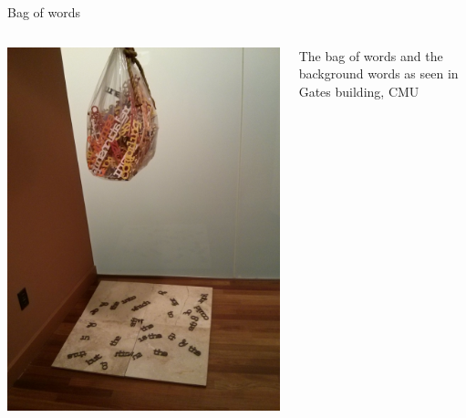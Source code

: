 \documentclass[11pt]{beamer}
\begin{document}
\begin{frame}{Bag of words}
\begin{columns}
  \begin{column}{0.6\textwidth}
 \includegraphics[width=\textwidth]{CMU_BOW.jpg}  
  \end{column}
 \begin{column}{0.5\textwidth}
 The bag of words and the background words as seen in Gates building, CMU
 \end{column}
\end{columns}
\end{frame}
\end{document}
